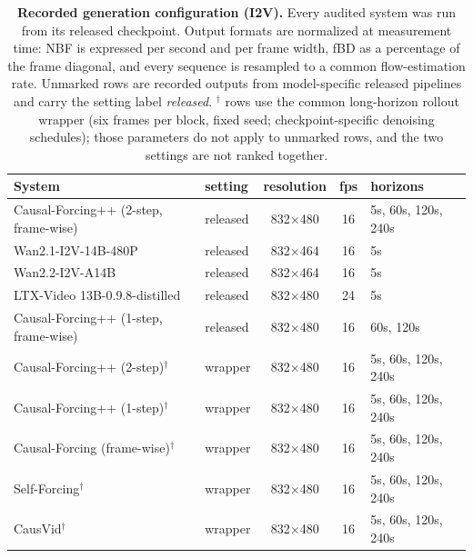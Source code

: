 \begin{table}[tb]
\centering
\small
\setlength{\tabcolsep}{5pt}
\begin{tabular}{l l c c l}
\toprule
System & setting & resolution & fps & horizons \\
\midrule
Causal-Forcing++ (2-step, frame-wise) & released & 832$\times$480 & 16 & 5s, 60s, 120s, 240s \\
Wan2.1-I2V-14B-480P & released & 832$\times$464 & 16 & 5s \\
Wan2.2-I2V-A14B & released & 832$\times$464 & 16 & 5s \\
LTX-Video 13B-0.9.8-distilled & released & 832$\times$480 & 24 & 5s \\
Causal-Forcing++ (1-step, frame-wise) & released & 832$\times$480 & 16 & 60s, 120s \\
Causal-Forcing++ (2-step)$^{\dagger}$ & wrapper & 832$\times$480 & 16 & 5s, 60s, 120s, 240s \\
Causal-Forcing++ (1-step)$^{\dagger}$ & wrapper & 832$\times$480 & 16 & 5s, 60s, 120s, 240s \\
Causal-Forcing (frame-wise)$^{\dagger}$ & wrapper & 832$\times$480 & 16 & 5s, 60s, 120s, 240s \\
Self-Forcing$^{\dagger}$ & wrapper & 832$\times$480 & 16 & 5s, 60s, 120s, 240s \\
CausVid$^{\dagger}$ & wrapper & 832$\times$480 & 16 & 5s, 60s, 120s, 240s \\
\bottomrule
\end{tabular}
\caption{\textbf{Recorded generation configuration (I2V).} Every audited system was run from its released checkpoint. Output formats are normalized at measurement time: NBF is expressed per second and per frame width, fBD as a percentage of the frame diagonal, and every sequence is resampled to a common flow-estimation rate. Unmarked rows are recorded outputs from model-specific released pipelines and carry the setting label \emph{released}. $^{\dagger}$ rows use the common long-horizon rollout wrapper (six frames per block, fixed seed; checkpoint-specific denoising schedules); those parameters do not apply to unmarked rows, and the two settings are not ranked together.}
\label{tab:native_config_i2v}
\end{table}